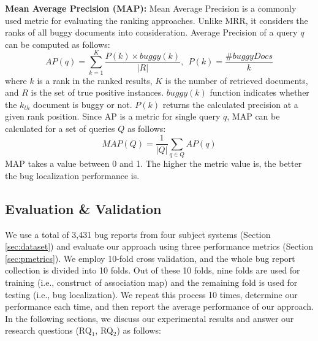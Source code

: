 \documentclass[conference]{IEEEtran}
\begin{document}
\textbf{Mean Average Precision (MAP):}
Mean Average Precision is a commonly used metric for evaluating the ranking approaches. Unlike MRR, it considers the ranks of all buggy documents into consideration. 
Average Precision of a query $q$ can be computed as follows:
\begin{equation*}
AP(q)=\sum_{k=1}^{K}\frac{P(k)\times buggy(k)}{|R|},~~P(k)=\frac{\#buggyDocs}{k}
\end{equation*}
where $k$ is a rank in the ranked results, $K$ is the number of retrieved documents, and $R$ is the set of true positive instances. $buggy(k)$ function indicates whether the $k_{th}$ document is buggy or not. $P(k)$ returns the calculated precision at a given rank position. Since AP is a metric for single query $q$, MAP can be calculated for a set of queries $Q$ as follows:
\begin{equation*}
MAP(Q) = \frac{1}{|Q|}\sum_{q\in Q}AP(q)
\end{equation*}
MAP takes a value between 0 and 1. The higher the metric value is, the better the bug localization performance is.


%



\subsection{Evaluation \& Validation}\label{RQ1answer}
We use a total of 3,431 bug reports from four subject systems (Section \ref{sec:dataset}) and evaluate our approach using three performance metrics (Section \ref{sec:pmetrics}). We employ 10-fold cross validation, and the whole bug report collection is divided into 10 folds. Out of these 10 folds, 
nine folds are used for training (i.e., construct of association map) and the remaining fold is used for testing (i.e., bug localization). We repeat this process 10 times, determine our performance each time, and then report the average performance of our approach. In the following sections, we discuss our experimental results and answer our research questions (RQ$_1$, RQ$_2$) as follows:
\end{document}
